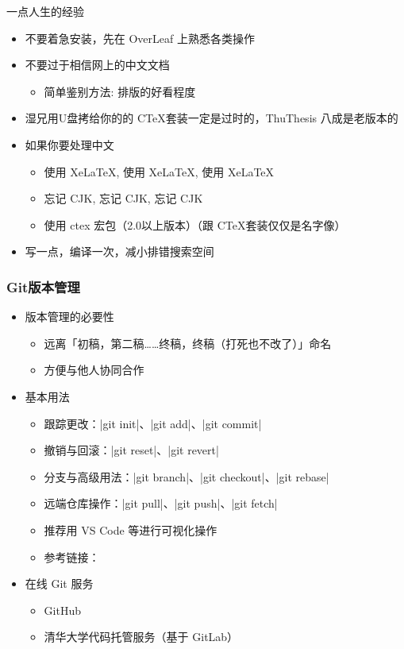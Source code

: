 \begin{frame}{一点人生的经验}
  \begin{itemize}
    \item 不要着急安装，先在 OverLeaf 上熟悉各类操作
    \item 不要过于相信网上的中文文档
      \begin{itemize}
        \item 简单鉴别方法: 排版的好看程度
      \end{itemize}
    \item 湿兄用U盘拷给你的的 C\TeX 套装一定是过时的，ThuThesis 八成是老版本的
    \item 如果你要处理中文
      \begin{itemize}
        \item 使用 XeLaTeX, 使用 XeLaTeX, 使用 XeLaTeX
        \item 忘记 CJK, 忘记 CJK, 忘记 CJK
        \item 使用 ctex 宏包（2.0以上版本）（跟 C\TeX 套装仅仅是名字像）
      \end{itemize}
    \item 写一点，编译一次，减小排错搜索空间
  \end{itemize}
\end{frame}

\begin{frame}[fragile]
  \frametitle{Git版本管理}
  \begin{itemize}
    \item 版本管理的必要性
      \begin{itemize}
        \item 远离「初稿，第二稿……终稿，终稿（打死也不改了）」命名
        \item 方便与他人协同合作
      \end{itemize}
    \item 基本用法
      \begin{itemize}
        \item 跟踪更改：|git init|、|git add|、|git commit|
        \item 撤销与回滚：|git reset|、|git revert|
        \item 分支与高级用法：|git branch|、|git checkout|、|git rebase|
        \item 远端仓库操作：|git pull|、|git push|、|git fetch|
        \item 推荐用 VS Code 等进行可视化操作
        \item 参考链接：
      \end{itemize}
    \item 在线 Git 服务
      \begin{itemize}
        \item GitHub \href{https://github.com}{\faGithub}
        \item 清华大学代码托管服务（基于 GitLab） 
      \end{itemize}
  \end{itemize}
  \end{frame}

